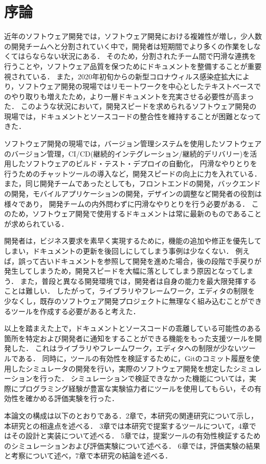 \chapter{序論}
近年のソフトウェア開発では，ソフトウェア開発における複雑性が増し，少人数の開発チームへと分割されていく中で，開発者は短期間でより多くの作業をしなくてはらならない状況にある．
そのため，分割されたチーム間で円滑な連携を行うことや，ソフトウェア品質を保つためにドキュメントを整備することが重要視されている\cite{maintenance}．
また，2020年初旬からの新型コロナウィルス感染症拡大により，ソフトウェア開発の現場ではリモートワークを中心としたテキストベースでのやり取りも増えたため，より一層ドキュメントを充実させる必要性が高まった．
このような状況において，開発スピードを求められるソフトウェア開発の現場では，ドキュメントとソースコードの整合性を維持することが困難となってきた．

ソフトウェア開発の現場では，バージョン管理システムを使用したソフトウェアのバージョン管理，CI/CD(継続的インテグレーション/継続的デリバリー)を活用したソフトウェアのビルド・テスト・デプロイの自動化，
円滑なやりとりを行うためのチャットツールの導入など，開発スピードの向上に力を入れている．
また，同じ開発チームであったとしても，フロントエンドの開発，バックエンドの開発，モバイルアプリケーションの開発，デザインの調整など開発者の役割は様々であり，
開発チームの内外問わずに円滑なやりとりを行う必要がある．
このため，ソフトウェア開発で使用するドキュメントは常に最新のものであることが求められている．

開発者は，ビジネス要求を素早く実現するために，機能の追加や修正を優先してしまい，ドキュメントの更新を後回しにしてしまう事例は少なくない．
例えば，誤って古いドキュメントを参照して開発を進めた場合，後の段階で手戻りが発生してしまうため，開発スピードを大幅に落としてしまう原因となってしまう．
また，普段と異なる開発環境では，開発者は自身の能力を最大限発揮することは難しい．
したがって，ライブラリやフレームワーク，エディタの制限を少なくし，既存のソフトウェア開発プロジェクトに無理なく組み込むことができるツールを作成する必要があると考えた．

以上を踏まえた上で，ドキュメントとソースコードの乖離している可能性のある箇所を特定および開発者に通知をすることができる機能をもった支援ツールを開発した．
これはライブラリやフレームワーク，エディタへの制限が少ないツールである．
同時に，ツールの有効性を検証するために，Gitのコミット履歴を使用したシミュレータの開発を行い，実際のソフトウェア開発を想定したシミュレーションを行った．
シミュレーションで検証できなかった機能については，実際にプログラミング経験が豊富な実験協力者にツールを使用してもらい，その有効性を確かめる評価実験を行った．

本論文の構成は以下のとおりである．2章で，本研究の関連研究について示し，本研究との相違点を述べる．
3章では本研究で提案するツールについて，4章ではその設計と実装について述べる．
5章では，提案ツールの有効性検証するためのシミュレーションおよび評価実験について述べる．
6章では，評価実験の結果と考察について述べ，7章で本研究の結論を述べる．